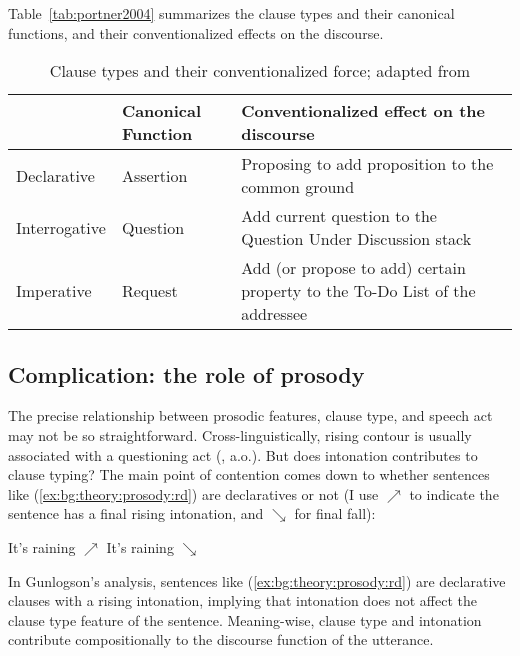 Table~\ref{tab:portner2004} summarizes the clause types and their canonical functions, and their conventionalized effects on the discourse.

\begin{table}[H]
\begin{center}
\begin{tabular}{l|l|p{8cm}} 
\hline 
& Canonical Function & Conventionalized effect on the discourse \\
\hline
Declarative & Assertion & Proposing to add proposition to the common ground \\ 
\hline
Interrogative & Question & Add current question to the Question Under Discussion stack \\
\hline
Imperative & Request & Add (or propose to add) certain property to the To-Do List of the addressee \\ 
\hline
\end{tabular} 
\end{center}
\caption{Clause types and their conventionalized force; adapted from \textcite[p.238]{portner2004}}
\label{tab:intro:portner2004}
\end{table}



\subsection{Complication: the role of prosody}
\label{sec:bg:theory:prosody}
The precise relationship between prosodic features, clause type, and speech act may not be so straightforward. Cross-linguistically, rising contour is usually associated with a questioning act (\citealt{bolinger1978, ladd1981, gussenhovenchen2000, ladd2001typology}, a.o.). But does intonation contributes to clause typing? The main point of contention comes down to whether sentences like (\ref{ex:bg:theory:prosody:rd}) are declaratives or not (I use $\nearrow$ to indicate the sentence has a final rising intonation, and $\searrow$ for final fall):
 
It's raining $\nearrow$
\eex
{}
It's raining $\searrow$
\eex


In Gunlogson's \cite*{gunlogson2008} analysis, sentences like (\ref{ex:bg:theory:prosody:rd}) are declarative clauses with a rising intonation, implying that intonation does not affect the clause type feature of the sentence. Meaning-wise, clause type and intonation contribute compositionally to the discourse function of the utterance. 


